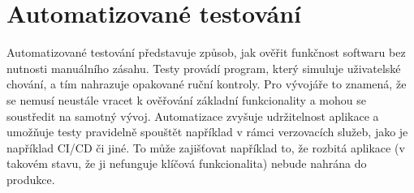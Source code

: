 




\section{Automatizované testování}

Automatizované testování představuje způsob, jak ověřit funkčnost softwaru bez nutnosti manuálního zásahu.
Testy provádí program, který simuluje uživatelské chování, a tím nahrazuje opakované ruční kontroly.
Pro vývojáře to znamená, že se nemusí neustále vracet k ověřování základní funkcionality a mohou se soustředit na samotný vývoj. 
Automatizace zvyšuje udržitelnost aplikace a umožňuje testy pravidelně spouštět například v rámci verzovacích služeb, jako je například CI/CD či jiné.
To může zajišťovat například to, že rozbitá aplikace (v takovém stavu, že ji nefunguje klíčová funkcionalita) nebude nahrána do produkce.

